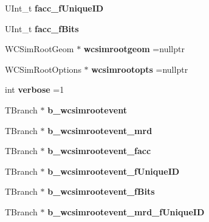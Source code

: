 \begin{DoxyCompactItemize}
\item 
\hypertarget{classwcsimT_ac38dca07015621491de881df5f0e517b}{U\-Int\-\_\-t {\bfseries facc\-\_\-f\-Unique\-I\-D}}\label{classwcsimT_ac38dca07015621491de881df5f0e517b}

\item 
\hypertarget{classwcsimT_aa97edda9dcf4901e10cf192074a19026}{U\-Int\-\_\-t {\bfseries facc\-\_\-f\-Bits}}\label{classwcsimT_aa97edda9dcf4901e10cf192074a19026}

\item 
\hypertarget{classwcsimT_afa9c52bd9009b784bd99f1027da94c5f}{W\-C\-Sim\-Root\-Geom $\ast$ {\bfseries wcsimrootgeom} =nullptr}\label{classwcsimT_afa9c52bd9009b784bd99f1027da94c5f}

\item 
\hypertarget{classwcsimT_a99c3ad47a66bf473c252fbe1c27b33be}{W\-C\-Sim\-Root\-Options $\ast$ {\bfseries wcsimrootopts} =nullptr}\label{classwcsimT_a99c3ad47a66bf473c252fbe1c27b33be}

\item 
\hypertarget{classwcsimT_a962abd92fae523373e395d8238a94f65}{int {\bfseries verbose} =1}\label{classwcsimT_a962abd92fae523373e395d8238a94f65}

\item 
\hypertarget{classwcsimT_a34f268aa1a4bd59c0a36c45da8c16ef1}{T\-Branch $\ast$ {\bfseries b\-\_\-wcsimrootevent}}\label{classwcsimT_a34f268aa1a4bd59c0a36c45da8c16ef1}

\item 
\hypertarget{classwcsimT_a79e5ff7d30e24c74b718c15c02597814}{T\-Branch $\ast$ {\bfseries b\-\_\-wcsimrootevent\-\_\-mrd}}\label{classwcsimT_a79e5ff7d30e24c74b718c15c02597814}

\item 
\hypertarget{classwcsimT_af4806c80e345526543720ac5cacaa9f6}{T\-Branch $\ast$ {\bfseries b\-\_\-wcsimrootevent\-\_\-facc}}\label{classwcsimT_af4806c80e345526543720ac5cacaa9f6}

\item 
\hypertarget{classwcsimT_a6766953ba955ffa07d0cc03778a08468}{T\-Branch $\ast$ {\bfseries b\-\_\-wcsimrootevent\-\_\-f\-Unique\-I\-D}}\label{classwcsimT_a6766953ba955ffa07d0cc03778a08468}

\item 
\hypertarget{classwcsimT_ac7859021cb4cd3119d20babf73aa0808}{T\-Branch $\ast$ {\bfseries b\-\_\-wcsimrootevent\-\_\-f\-Bits}}\label{classwcsimT_ac7859021cb4cd3119d20babf73aa0808}

\item 
\hypertarget{classwcsimT_add3208592814b127cb437efebc56dc7a}{T\-Branch $\ast$ {\bfseries b\-\_\-wcsimrootevent\-\_\-mrd\-\_\-f\-Unique\-I\-D}}\label{classwcsimT_add3208592814b127cb437efebc56dc7a}


\end{DoxyCompactItemize}
